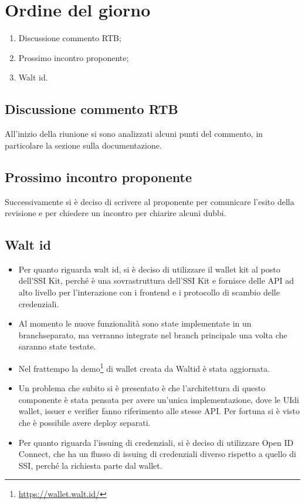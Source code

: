 \section{Ordine del giorno}
\begin{enumerate}
\item Discussione commento RTB;
\item Prossimo incontro proponente;
\item Walt id.%
\end{enumerate}
\subsection{Discussione commento RTB}
All'inizio della riunione si sono analizzati alcuni punti del commento, in particolare la sezione sulla documentazione.
\subsection{Prossimo incontro proponente}
Successivamente si è deciso di scrivere al proponente per comunicare l'esito della revisione e per chiedere un incontro per chiarire alcuni dubbi. %
\subsection{Walt id}

\begin{itemize}
    \item Per quanto riguarda walt id, si è deciso di utilizzare il wallet kit al posto dell'SSI Kit, perché è una sovrastruttura dell'SSI Kit e fornisce delle API ad alto livello per l'interazione con i frontend e i protocollo di scambio delle credenziali.
    \item Al momento le nuove funzionalità sono state implementate in un branch\glo separato, ma verranno integrate nel branch principale una volta che saranno state testate.
    \item Nel frattempo la demo\footnote[1]{\url{https://wallet.walt.id/}} di wallet creata da Waltid è stata aggiornata.
    \item Un problema che subito si è presentato è che l'architettura di questo componente è stata pensata per avere un'unica implementazione, dove le UI\glo di wallet, issuer e verifier fanno riferimento alle stesse API. Per fortuna si è visto che è possibile avere deploy separati.
    \item Per quanto riguarda l'issuing di credenziali, si è deciso di utilizzare Open ID Connect, che ha un flusso di issuing di credenziali diverso rispetto a quello di SSI, perché la richiesta parte dal wallet.
\end{itemize}



